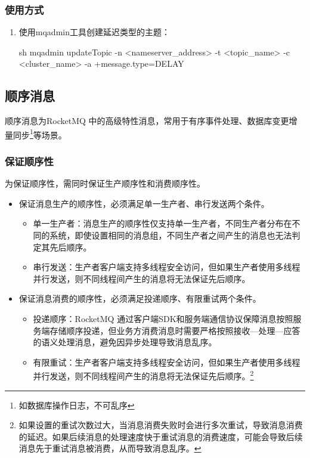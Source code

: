 \documentclass[11pt, a4paper, oneside, fontset=none]{ctexbook}
\begin{document}
\subsubsection{使用方式}
\begin{enumerate}
  \item 使用mqadmin工具创建延迟类型的主题：
  \begin{bash}
    sh mqadmin updateTopic -n <nameserver_address> -t <topic_name> -c <cluster_name> -a +message.type=DELAY
  \end{bash}
\end{enumerate}

\subsection{顺序消息}
顺序消息为RocketMQ 中的高级特性消息，常用于有序事件处理、数据库变更增量同步\footnote{如数据库操作日志，不可乱序}等场景。

\subsubsection{保证顺序性}
为保证顺序性，需同时保证生产顺序性和消费顺序性。
\begin{itemize}
  \item 保证消息生产的顺序性，必须满足单一生产者、串行发送两个条件。
  \begin{itemize}
    \item 单一生产者：消息生产的顺序性仅支持单一生产者，不同生产者分布在不同的系统，即使设置相同的消息组，不同生产者之间产生的消息也无法判定其先后顺序。
    \item 串行发送：生产者客户端支持多线程安全访问，但如果生产者使用多线程并行发送，则不同线程间产生的消息将无法保证先后顺序。
  \end{itemize}
  \item 保证消息消费的顺序性，必须满足投递顺序、有限重试两个条件。
  \begin{itemize}
    \item 投递顺序：RocketMQ 通过客户端SDK和服务端通信协议保障消息按照服务端存储顺序投递，但业务方消费消息时需要严格按照接收---处理---应答的语义处理消息，避免因异步处理导致消息乱序。
    \item 有限重试：生产者客户端支持多线程安全访问，但如果生产者使用多线程并行发送，则不同线程间产生的消息将无法保证先后顺序。\footnote{如果设置的重试次数过大，当消息消费失败时会进行多次重试，导致消息消费的延迟。如果后续消息的处理速度快于重试消息的消费速度，可能会导致后续消息先于重试消息被消费，从而导致消息乱序。}
  \end{itemize}
\end{itemize}
\end{document}
